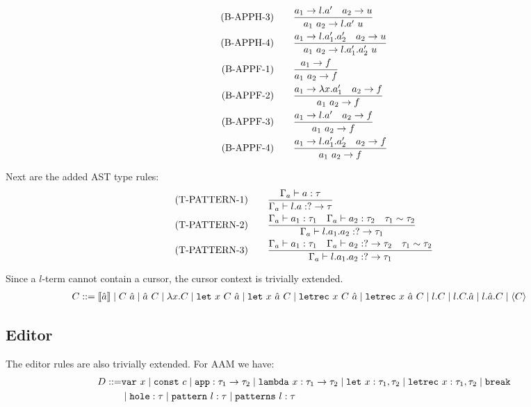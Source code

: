 \documentclass[10pt,a4paper,english]{article}
\newcommand\letin[3]{\texttt{let}~#1~#2~#3}
\newcommand\letrec[3]{\texttt{letrec}~#1~#2~#3}
\begin{document}
\begin{align}
(\text{B-APPH-3})\qquad
&\frac{a_1\to l.a'\quad a_2\to u}{a_1~a_2 \to l.a'~u}\\
(\text{B-APPH-4})\qquad
&\frac{a_1\to l.a_1'.a_2'\quad a_2\to u}{a_1~a_2 \to l.a_1'.a_2'~u}\\
(\text{B-APPF-1})\qquad
&\frac{a_1\to f}{a_1~a_2 \to f}\\
(\text{B-APPF-2})\qquad
&\frac{a_1\to \lambda x.a'_1\quad a_2\to f}{a_1~a_2 \to f}\\
(\text{B-APPF-3})\qquad
&\frac{a_1\to l.a'\quad a_2\to f}{a_1~a_2 \to f}\\
(\text{B-APPF-4})\qquad
&\frac{a_1\to l.a_1'.a_2'\quad a_2\to f}{a_1~a_2 \to f}
\end{align}

Next are the added AST type rules:
\begin{align}
  (\text{T-PATTERN-1})\qquad&\frac{\Gamma_{a} \vdash a : \tau}{\Gamma_{a} \vdash l.a : ?\to\tau}\\
  (\text{T-PATTERN-2})\qquad&\frac{\Gamma_{a} \vdash a_1 : \tau_1\quad \Gamma_{a} \vdash a_2 : \tau_2\quad\tau_1\sim\tau_2}{\Gamma_{a} \vdash l.a_1.a_2 : ?\to\tau_1}\\
  (\text{T-PATTERN-3})\qquad&\frac{\Gamma_{a} \vdash a_1 : \tau_1\quad \Gamma_{a} \vdash a_2 : ?\to\tau_2\quad\tau_1\sim\tau_2}{\Gamma_{a} \vdash l.a_1.a_2 : ?\to\tau_1}\\
\end{align}

Since a $l$-term cannot contain a cursor, the cursor context is trivially extended.
\begin{align}
  C &::= \cursor{\hat{a}}
\mid \app{C}{\hat{a}}
\mid \app{\hat{a}}{C}
\mid \abs{x}{C}
\mid \letin{x}{C}{\hat{a}}
\mid \letin{x}{\hat{a}}{C}
\mid \letrec{x}{C}{\hat{a}}
\mid \letrec{x}{\hat{a}}{C}
\mid l.C
\mid l.C.\hat{a}
\mid l.\hat{a}.C
\mid \breakpoint{C}
\end{align}





\subsection{Editor}
The editor rules are also trivially extended. For AAM we have:
\begin{align}
  D ::= &\texttt{var}~x
  \mid \texttt{const}~c
  \mid \texttt{app} : \tau_1\to\tau_2
  \mid \texttt{lambda}~x : \tau_1\to\tau_2
  \mid \texttt{let}~x : \tau_1,\tau_2
  \mid \texttt{letrec}~x : \tau_1,\tau_2
  \mid \texttt{break}\\
  &\mid \texttt{hole} : \tau
  \mid\texttt{pattern}~l : \tau
  \mid\texttt{patterns}~l : \tau
\end{align}
\end{document}
